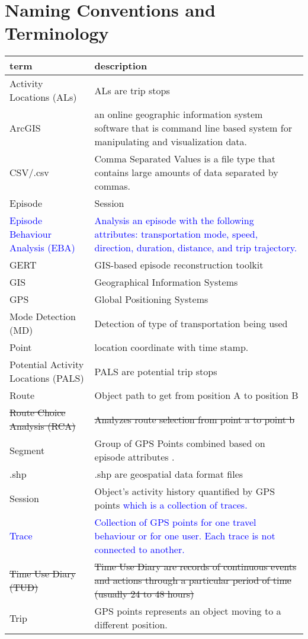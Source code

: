 \documentclass[12pt, titlepage]{article}
\begin{document}
\section{Naming Conventions and Terminology}
\begin{tabular}{l p{6cm}} 
  \toprule		
  \textbf{term} & \textbf{description}\\
  \midrule 
  Activity Locations (ALs) & ALs are trip stops \\
  ArcGIS & an online geographic information system software that is command line based system for manipulating and visualization data.\\
  CSV/.csv & Comma Separated Values is a file type that contains large amounts of data separated by commas. \\
  Episode & Session\\
  \textcolor{blue}{Episode Behaviour Analysis (EBA)} & \textcolor{blue}{Analysis an episode with the following attributes: transportation mode, speed, direction, duration, distance, and trip trajectory.} \\
  GERT & GIS-based episode reconstruction toolkit \\
  GIS & Geographical Information Systems\\
  GPS & Global Positioning Systems\\
  Mode Detection (MD) & Detection of type of transportation being used \\
  Point & location coordinate with time stamp.\\
  Potential Activity Locations (PALS) & PALS are potential trip stops \\
  Route & Object path to get from position A to position B\\
  \sout{Route Choice Analysis (RCA)} & \sout{Analyzes route selection from point a to point b}\\
  Segment & Group of GPS Points combined based on episode attributes .\\
  .shp & .shp are geospatial data format files\\
  Session & Object's activity history quantified by GPS points \textcolor{blue}{which is a collection of traces.} \\
  \textcolor{blue}{Trace} & \textcolor{blue}{Collection of GPS points for one travel behaviour or for one user. Each trace is not connected to another.}\\
  \sout{Time Use Diary (TUD)} & \sout{Time Use Diary are records of continuous events and actions through a particular period of time (usually 24 to 48 hours)}\\
  Trip & GPS points represents an object moving to a different position.\\
  
  \bottomrule
\end{tabular}\\
\end{document}

